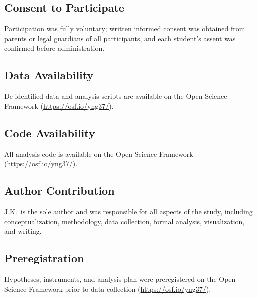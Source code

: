 \documentclass[pdflatex,sn-apa]{sn-jnl}%
\begin{document}
\subsection*{Consent to Participate}

Participation was fully voluntary; written informed consent was obtained from parents or legal guardians of all participants, and each student's assent was confirmed before administration.

\subsection*{Data Availability}

De-identified data and analysis scripts are available on the Open Science Framework (\url{https://osf.io/yng37/}).

\subsection*{Code Availability}

All analysis code is available on the Open Science Framework (\url{https://osf.io/yng37/}).

\subsection*{Author Contribution}

J.K.\ is the sole author and was responsible for all aspects of the study, including conceptualization, methodology, data collection, formal analysis, visualization, and writing.

\subsection*{Preregistration}

Hypotheses, instruments, and analysis plan were preregistered on the Open Science Framework prior to data collection (\url{https://osf.io/yng37/}).
\end{document}
